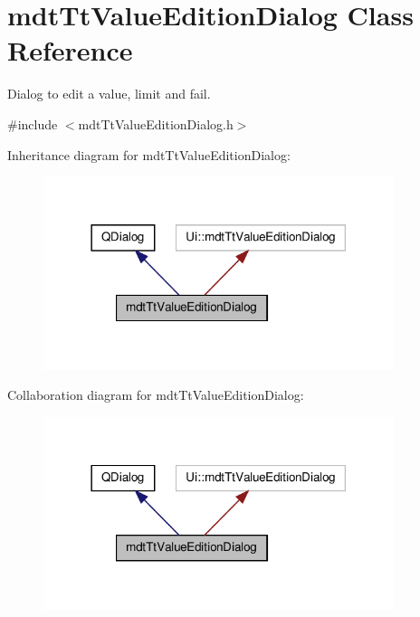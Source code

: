 \hypertarget{classmdt_tt_value_edition_dialog}{\section{mdt\-Tt\-Value\-Edition\-Dialog Class Reference}
\label{classmdt_tt_value_edition_dialog}
}


Dialog to edit a value, limit and fail.  




{\ttfamily \#include $<$mdt\-Tt\-Value\-Edition\-Dialog.\-h$>$}



Inheritance diagram for mdt\-Tt\-Value\-Edition\-Dialog\-:
\nopagebreak
\begin{figure}[H]
\begin{center}
\leavevmode
\includegraphics[width=290pt]{classmdt_tt_value_edition_dialog__inherit__graph}
\end{center}
\end{figure}


Collaboration diagram for mdt\-Tt\-Value\-Edition\-Dialog\-:
\nopagebreak
\begin{figure}[H]
\begin{center}
\leavevmode
\includegraphics[width=290pt]{classmdt_tt_value_edition_dialog__coll__graph}
\end{center}
\end{figure}
